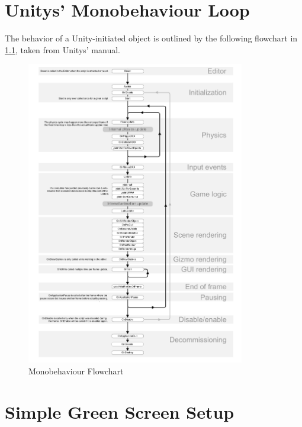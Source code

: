 %

\begingroup
\let\cleardoublepage\clearpage

\chapter{Unitys' Monobehaviour Loop}
\label{app:engineloop}

The behavior of a Unity-initiated object is outlined by the following 
flowchart in \ref{fig:appendix:monoflow}, taken from Unitys' manual.

\begin{figure}[htb]
	\centering
	\includegraphics[width=0.85\textwidth]{_external/media/monobehaviour_flowchart2.pdf}
	\caption{Monobehaviour Flowchart}
	\label{fig:appendix:monoflow}
\end{figure}


\chapter{Simple Green Screen Setup}
\label{app:lightningsetup}

